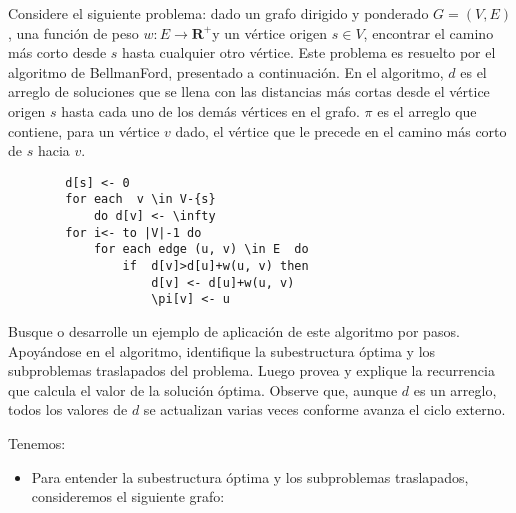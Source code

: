 \begin{problema}
    Considere el siguiente problema: dado un grafo dirigido y ponderado $G=(V, E)$, una función de peso $w: E \rightarrow \mathbf{R}^{+}$y un vértice origen $s \in V$, encontrar el camino más corto desde $s$ hasta cualquier otro vértice. Este problema es resuelto por el algoritmo de BellmanFord, presentado a continuación. En el algoritmo, $d$ es el arreglo de soluciones que se llena con las distancias más cortas desde el vértice origen $s$ hasta cada uno de los demás vértices en el grafo. $\pi$ es el arreglo que contiene, para un vértice $v$ dado, el vértice que le precede en el camino más corto de $s$ hacia $v$. 
    \begin{verbatim}
        d[s] <- 0
        for each  v \in V-{s} 
            do d[v] <- \infty
        for i<- to |V|-1 do
            for each edge (u, v) \in E  do
                if  d[v]>d[u]+w(u, v) then 
                    d[v] <- d[u]+w(u, v)  
                    \pi[v] <- u
    \end{verbatim}
    Busque o desarrolle un ejemplo de aplicación de este algoritmo por pasos. Apoyándose en el algoritmo, identifique la subestructura óptima y los subproblemas traslapados del problema. Luego provea y explique la recurrencia que calcula el valor de la solución óptima. Observe que, aunque $d$ es un arreglo, todos los valores de $d$ se actualizan varias veces conforme avanza el ciclo externo.
    \begin{sol}
        Tenemos: 

        \begin{itemize}
            \item Para entender la subestructura óptima y los subproblemas traslapados, consideremos el siguiente grafo:
            
               \begin{center}
               \end{center}


\end{itemize}
\end{sol}
\end{problema}
